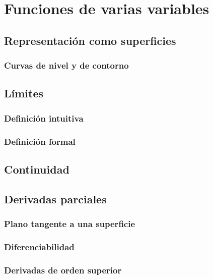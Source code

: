 \documentclass[12pt, fleqn]{report}                             %
\begin{document}
    \chapter{Funciones de varias variables}
    
        \section{Representación como superficies}
        
            \subsection{Curvas de nivel y de contorno}
            
        \section{Límites}
            
            \subsection{Definición intuitiva}
            
            \subsection{Definición formal}
            
        \section{Continuidad}
        
        \section{Derivadas parciales}
        
            \subsection{Plano tangente a una superficie}
            
            \subsection{Diferenciabilidad}
            
            \subsection{Derivadas de orden superior}
            
\end{document}
